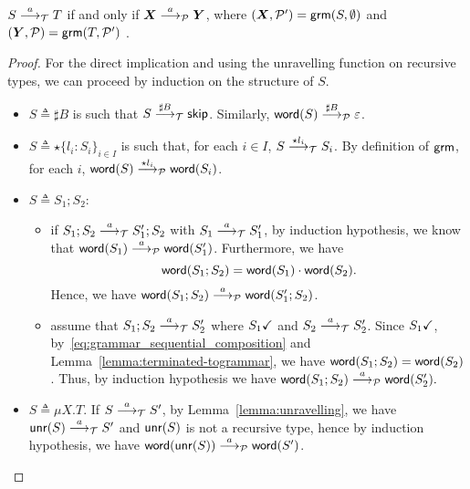 \newcommand{\grmcontext}{
  $(\vec X, \productions') = \grm(S, \emptyset)$ and 
  $(\vec Y, \productions) = \grm(T, \productions')$%
}

\begin{lemma}
  \label{lem:transitions_mimic}
  $S \LTSderives T$ if and only if $\vec X \LTSderivesP \vec Y$, 
  where \grmcontext.
\end{lemma}
%
\begin{proof}
	For the direct implication and using the unravelling
	function on recursive types, we can proceed by induction
	on the structure of $S$. 
	
	\begin{itemize}
		\item $S\triangleq\sharp B$ is such that $S \LTSderives[\sharp B] \skipk$.
		Similarly, $\word(S) \LTSderivesP[\sharp B] \varepsilon$.
		\item $S\triangleq\star\{l_i\colon S_i\}_{i\in I}$ is such that, for each $i\in I$,
		$S \LTSderives[\star l_i] S_i$. By definition of $\grm$, for each $i$, 
		$\word(S) \LTSderivesP[\star l_i] \word(S_i)$.
		\item $S\triangleq S_1;S_2$:
		\begin{itemize}
			\item if $S_1;S_2\LTSderives S_1';S_2$ with $S_1\LTSderives S_1'$,
			by induction hypothesis, we know that $\word(S_1) \LTSderivesP \word(S_1')$.
			Furthermore, we have
			\begin{equation}
			\label{eq:grammar_sequential_composition}
				\word(S_1;S_2) = \word(S_1)\cdot\word(S_2).	
			\end{equation}
			Hence, we have $\word(S_1;S_2) \LTSderivesP \word(S_1';S_2)$.
			\item assume that $S_1;S_2\LTSderives S_2'$ where 
				$\DONE{S_1}$ and $S_2\LTSderives S_2'$.
			Since $\DONE{S_1}$, 
			by~\eqref{eq:grammar_sequential_composition} and
			Lemma~\ref{lemma:terminated-togrammar}, 
			we have $\word(S_1;S_2) = \word(S_2)$.
			Thus, by induction hypothesis we have 
			$\word(S_1;S_2) \LTSderivesP \word(S_2').$
		\end{itemize}
		\item $S\triangleq\mu X.T$. If $S\LTSderives S'$, by Lemma~\ref{lemma:unravelling},
		we have $\Unravel(S) \LTSderives S'$ and $\Unravel(S)$ is not a recursive
		type, hence by induction hypothesis, we have
		$\word(\Unravel(S))\LTSderivesP \word(S')$.

\end{itemize}
\end{proof}
